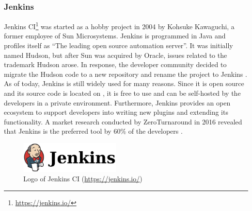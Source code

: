 
\subsubsection{Jenkins}
Jenkins CI\footnote{\url{https://jenkins.io/}} was started as a hobby project in 2004 by Kohsuke Kawaguchi, a former employee of Sun Microsystems. Jenkins is programmed in Java and profiles itself as ``The leading open source automation server''. It was initially named Hudson, but after Sun was acquired by Oracle, issues related to the trademark Hudson arose. In response, the developer community decided to migrate the Hudson code to a new repository and rename the project to Jenkins \cite{SmartJenkinsDefinitive}. As of today, Jenkins is still widely used for many reasons. Since it is open source and its source code is located on \github{}, it is free to use and can be self-hosted by the developers in a private environment. Furthermore, Jenkins provides an open ecosystem to support developers into writing new plugins and extending its functionality. A market research conducted by ZeroTurnaround in 2016 revealed that Jenkins is the preferred \CI{} tool by 60\% of the developers \cite{maple_2016}.

\begin{figure}[htbp!]
	\centering
	\includegraphics[width=0.45\textwidth]{assets/images/jenkins.pdf}
	\caption{Logo of Jenkins CI (\url{https://jenkins.io/})}
	\label{fig:jenkins}
\end{figure}